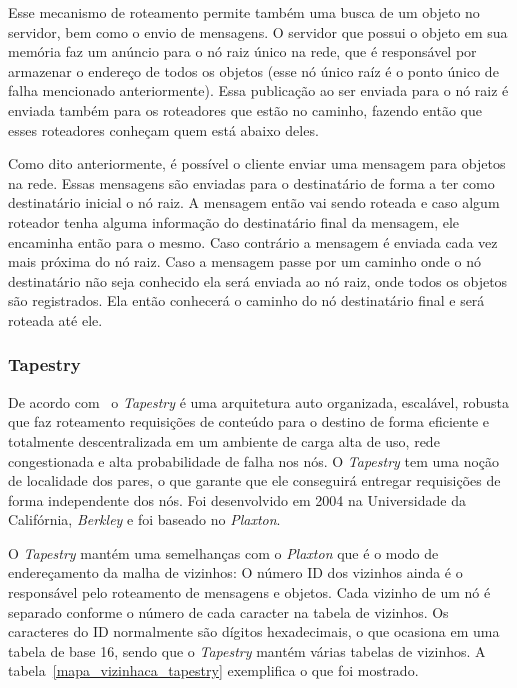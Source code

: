Esse mecanismo de roteamento permite também uma busca de um objeto no servidor, bem como o envio de mensagens. O servidor que possui o objeto em sua memória faz um anúncio para o nó raiz único na rede, que é responsável por armazenar o endereço de todos os objetos (esse nó único raíz é o ponto único de falha mencionado anteriormente). Essa publicação ao ser enviada para o nó raiz é enviada também para os roteadores que estão no caminho, fazendo então que esses roteadores conheçam quem está abaixo deles.

Como dito anteriormente, é possível o cliente enviar uma mensagem para objetos na rede. Essas mensagens são enviadas para o destinatário de forma a ter como destinatário inicial o nó raiz. A mensagem então vai sendo roteada e caso algum roteador tenha alguma informação do destinatário final da mensagem, ele encaminha então para o mesmo. Caso contrário a mensagem é enviada cada vez mais próxima do nó raiz. Caso a mensagem passe por um caminho onde o nó destinatário não seja conhecido ela será enviada ao nó raiz, onde todos os objetos são registrados. Ela então conhecerá o caminho do nó destinatário final e será roteada até ele.

\subsubsection{Tapestry}

De acordo com~\cite{rowstron01} o \emph{Tapestry} é uma arquitetura auto organizada, escalável, robusta que faz roteamento requisições de conteúdo para o destino de forma eficiente e totalmente descentralizada em um ambiente de carga alta de uso, rede congestionada e alta probabilidade de falha nos nós. O \emph{Tapestry} tem uma noção de localidade dos pares, o que garante que ele conseguirá entregar requisições de forma independente dos nós. Foi desenvolvido em 2004 na Universidade da Califórnia, \emph{Berkley} e foi baseado no \emph{Plaxton}.

O \emph{Tapestry} mantém uma semelhanças com o \emph{Plaxton} que é o modo de endereçamento da malha de vizinhos: O número ID dos vizinhos ainda é o responsável pelo roteamento de mensagens e objetos. Cada vizinho de um nó é separado conforme o número de cada caracter na tabela de vizinhos. Os caracteres do ID normalmente são dígitos hexadecimais, o que ocasiona em uma tabela de base 16, sendo que o \emph{Tapestry} mantém várias tabelas de vizinhos. A tabela~\ref{mapa_vizinhaca_tapestry} exemplifica o que foi mostrado.

